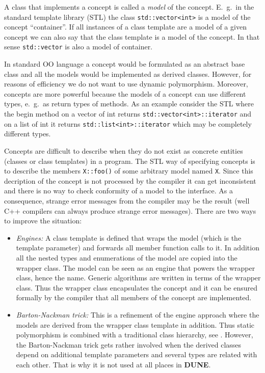 \documentclass[11pt,a4paper,headinclude,footinclude,DIV16,normalheadings]{scrreprt}
\newcommand{\Dune}{{\sf\bfseries DUNE}}
\begin{document}
A class that implements a concept is called a
\textit{model} of the concept. E.~g.~in the standard template library (STL)
the class \lstinline!std::vector<int>! is a model of the concept
``container''. If all instances of a class template are a model of
a given concept we can also say that the class template is a model of
the concept. In that sense \lstinline!std::vector! is also a model of
container.  

In standard OO language a concept would be formulated as
an abstract base class and all the models would be implemented as
derived classes. However, for reasons of efficiency we do not want to
use dynamic polymorphism. Moreover, concepts are more powerful because
the models of a concept can use different types, e.~g.~as return types of
methods. As an example consider the STL where the begin method on a
vector of int returns \lstinline!std::vector<int>::iterator! and on a
list of int it returns \lstinline!std::list<int>::iterator! which may
be completely different types. 

Concepts are difficult to describe when they do not exist as concrete
entities (classes or class templates) in a program. The STL way of
specifying concepts is to describe the members \lstinline!X::foo()! of
some arbitrary model named \lstinline!X!. Since this decription of the
concept is not processed by the compiler it can get inconsistent and
there is no way to check conformity of a model to the interface. As a
consequence, strange error messages from the compiler may be the
result (well C++ compilers can always produce strange error messages).
There are two ways to improve the situation:
\begin{itemize}
\item \textit{Engines:} A class template is defined that wraps the
  model (which is the template parameter) and forwards all member
  function calls to it. In addition all the nested types and
  enumerations of the model are copied into the wrapper class. 
  The model can be seen as an engine that powers the wrapper class,
  hence the name. Generic
  algorithms are written in terms of the wrapper class. Thus the
  wrapper class encapsulates the concept and it can be ensured
  formally by the compiler that
  all members of the concept are implemented.

\item \textit{Barton-Nackman trick:} This is a refinement of the
  engine approach where the models are derived from the wrapper class
  template in addition. Thus static polymorphism is combined
  with a traditional class hierarchy, see \cite{Veldhui99,BN}. 
  However, the
  Barton-Nackman trick gets rather involved when the derived classes
  depend on additional template parameters and several types are related
  with each other. That is why it is not used at all places in \Dune.
\end{itemize}
\end{document}
